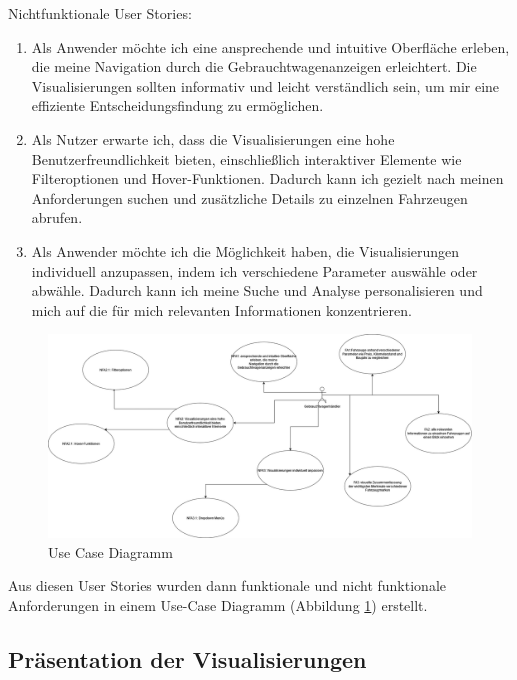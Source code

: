 Nichtfunktionale User Stories: \\
\begin{enumerate}
    \item Als Anwender möchte ich eine ansprechende und intuitive Oberfläche erleben, die meine Navigation durch die Gebrauchtwagenanzeigen erleichtert. Die Visualisierungen sollten informativ und leicht verständlich sein, um mir eine effiziente Entscheidungsfindung zu ermöglichen.
    
    \item Als Nutzer erwarte ich, dass die Visualisierungen eine hohe Benutzerfreundlichkeit bieten, einschließlich interaktiver Elemente wie Filteroptionen und Hover-Funktionen. Dadurch kann ich gezielt nach meinen Anforderungen suchen und zusätzliche Details zu einzelnen Fahrzeugen abrufen.
    
    \item Als Anwender möchte ich die Möglichkeit haben, die Visualisierungen individuell anzupassen, indem ich verschiedene Parameter auswähle oder abwähle. Dadurch kann ich meine Suche und Analyse personalisieren und mich auf die für mich relevanten Informationen konzentrieren.
    
\end{enumerate}



\begin{figure}[h]
    \centering
    \includegraphics[width = \textwidth]{img/uc_diagram.png}
    \caption{Use Case Diagramm}
    \label{fig:uc_diagram}
\end{figure}

Aus diesen User Stories wurden dann funktionale und nicht funktionale Anforderungen in einem Use-Case Diagramm (Abbildung \ref*{fig:uc_diagram}) erstellt. \\
\subsection{Präsentation der Visualisierungen}
